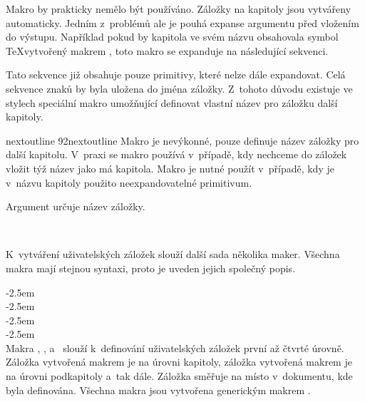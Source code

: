 \documentclass[12pt]{article}
\begin{document}
\medskip
Makro  by prakticky nemělo být používáno. 
Záložky na kapitoly
jsou vytvářeny automaticky. Jedním z~problémů ale je pouhá expanse argumentu
 před vložením do výstupu. Například pokud by kapitola ve svém
názvu obsahovala symbol \TeX vytvořený makrem , toto makro 
se expanduje na následující sekvenci.
\begin{flushleft}
\end{flushleft}
Tato sekvence již obsahuje pouze primitivy, které nelze dále expandovat. 
Celá sekvence znaků by byla uložena do jména záložky. Z~tohoto důvodu existuje
ve stylech speciální makro  umožňující definovat vlastní
název pro záložku další kapitoly.

\medskip
\begin{makro}{nextoutline}
  {\char92nextoutline}
  Makro  je nevýkonné, pouze definuje název záložky pro další
  kapitolu. V~praxi se makro používá v~případě, kdy nechceme do záložek vložit
  týž název jako má kapitola. Makro je nutné použít v~případě, kdy je v~názvu
  kapitoly použito neexpandovatelné primitivum.

  \smallskip
  Argument  určuje název záložky.

  \begin{example}
     \\
  \end{example}
\end{makro}

\medskip
K~vytváření uživatelských záložek slouží další sada několika maker. 
Všechna makra mají stejnou syntaxi, proto je uveden jejich společný popis.

\medskip\bgroup
\noindent%
%
%
\addtolength{\leftskip}{2.5em}\parindent=0pt
\null \kern-2.5em \\
\null \kern-2.5em \\
\null \kern-2.5em \\
\null \kern-2.5em \\[2pt]
Makra , , 
a~ slouží k~definování uživatelských záložek první
až čtvrté úrovně. Záložka vytvořená makrem  je na úrovni kapitoly,
záložka vytvořená makrem  je na úrovni podkapitoly a~tak dále.
Záložka směřuje na místo v~dokumentu, kde byla definována. Všechna makra
jsou vytvořena generickým makrem .
\end{document}
